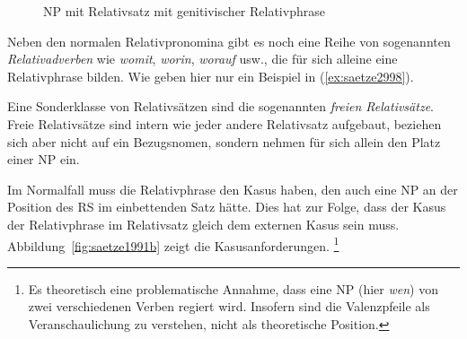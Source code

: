 \begin{figure}
  \centering
  \caption{NP mit Relativsatz mit genitivischer Relativphrase}
  \label{fig:saetze5553}
\end{figure}


Neben den normalen Relativpronomina gibt es noch eine Reihe von sogenannten \textit{Relativadverben} wie \textit{womit}, \textit{worin}, \textit{worauf} usw., die für sich alleine eine Relativphrase bilden.
Wie geben hier nur ein Beispiel in (\ref{ex:saetze2998}).

\begin{exe}
\end{exe}

Eine Sonderklasse von Relativsätzen sind die sogenannten \textit{freien Relativsätze}.
Freie Relativsätze sind intern wie jeder andere Relativsatz aufgebaut, beziehen sich aber nicht auf ein Bezugsnomen, sondern nehmen für sich allein den Platz einer NP ein.

\begin{exe}
  \ex\label{ex:saetze1991}
  \begin{xlist}
  \end{xlist}
\end{exe}


Im Normalfall muss die Relativphrase den Kasus haben, den auch eine NP an der Position des RS im einbettenden Satz hätte.
Dies hat zur Folge, dass der Kasus der Relativphrase im Relativsatz gleich dem externen Kasus sein muss.
Abbildung~\ref{fig:saetze1991b} zeigt die Kasusanforderungen.%
\footnote{Es theoretisch eine problematische Annahme, dass eine NP (hier \textit{wen}) von zwei verschiedenen Verben regiert wird.
Insofern sind die Valenzpfeile als Veranschaulichung zu verstehen, nicht als theoretische Position.}

